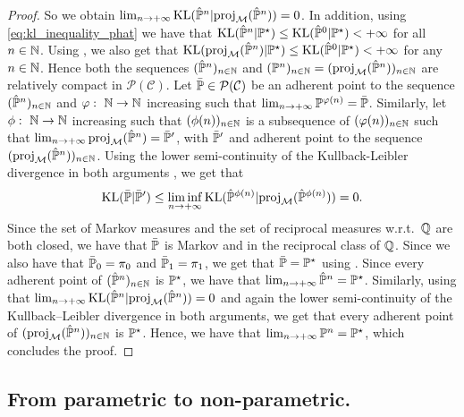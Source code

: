 \documentclass{article}
\begin{document}
\begin{proof}
So we obtain $\lim_{n \to +\infty} \mathrm{KL}( \hat{\mathbb{P}}^n | \mathrm{proj}_{\mathcal{M}}(\hat{\mathbb{P}}^n)) = 0$. In addition, using \eqref{eq:kl_inequality_phat} we have that $\mathrm{KL}(\hat{\mathbb{P}}^n | \mathbb{P}^\star) \leq \mathrm{KL}(\hat{\mathbb{P}}^0 | \mathbb{P}^\star) < +\infty$ for all $n \in \mathbb{N}$. Using \cite[Lemma 6]{shi2023DSBM}, we also get that $\mathrm{KL}(\mathrm{proj}_{\mathcal{M}}(\hat{\mathbb{P}}^n) | \mathbb{P}^\star) \leq \mathrm{KL}(\hat{\mathbb{P}}^0 | \mathbb{P}^\star) < +\infty$ for any $n \in \mathbb{N}$. Hence both the sequences $(\hat{\mathbb{P}}^n)_{n \in \mathbb{N}}$ and $(\mathbb{P}^n)_{n \in \mathbb{N}} = (\mathrm{proj}_{\mathcal{M}}(\hat{\mathbb{P}}^n))_{n \in \mathbb{N}}$ are relatively compact in $\mathcal{P}(\mathcal{C})$. 
Let $\bar{\mathbb{P}} \in \mathcal{P}(\mathcal{C})$ be an adherent point to the sequence $(\hat{\mathbb{P}}^n)_{n \in \mathbb{N}}$ and $\varphi: \ \mathbb{N} \to \mathbb{N}$ increasing such that $\lim_{n \to +\infty} \mathbb{P}^{\varphi(n)} = \bar{\mathbb{P}}$. Similarly, let $\phi: \ \nset \to \nset$ increasing such that $(\phi(n))_{n \in \mathbb{N}}$ is a subsequence of $(\varphi(n))_{n \in \mathbb{N}}$ such that $\lim_{n \to +\infty} \mathrm{proj}_{\mathcal{M}}(\hat{\mathbb{P}}^n) = \bar{\mathbb{P}}'$, with $\bar{\mathbb{P}}'$ and adherent point to the sequence $(\mathrm{proj}_{\mathcal{M}}(\hat{\mathbb{P}}^n))_{n \in \mathbb{N}}$. Using the lower semi-continuity of the Kullback-Leibler divergence in both arguments \citep{dupuis2011weak}, we get that 
\begin{equation}
 \mathrm{KL}(\bar{\mathbb{P}} | \bar{\mathbb{P}}') \leq \liminf_{n \to + \infty} \mathrm{KL}(\hat{\mathbb{P}}^{\phi(n)} | \mathrm{proj}_{\mathcal{M}}(\hat{\mathbb{P}}^{\phi(n)})) = 0 . 
\end{equation}
Since the set of Markov measures and the set of reciprocal measures w.r.t.~$\mathbb{Q}$ are both closed, we have that $\bar{\mathbb{P}}$ is Markov and in the reciprocal class of $\mathbb{Q}$. Since we also have that $\bar{\mathbb{P}}_0 = \pi_0$ and $\bar{\mathbb{P}}_1 = \pi_1$, we get that $\bar{\mathbb{P}} = \mathbb{P}^\star$ using . Since every adherent point of $(\hat{\mathbb{P}}^n)_{n \in \mathbb{N}}$ is $\mathbb{P}^\star$, we have that $\lim_{n \to +\infty} \hat{\mathbb{P}}^n = \mathbb{P}^\star$. Similarly, using that $\lim_{n \to +\infty} \mathrm{KL}( \hat{\mathbb{P}}^n | \mathrm{proj}_{\mathcal{M}}(\hat{\mathbb{P}}^n)) = 0$ and again the lower semi-continuity of the Kullback--Leibler divergence in both arguments, we get that every adherent point of $(\mathrm{proj}_{\mathcal{M}}(\hat{\mathbb{P}}^n))_{n \in \mathbb{N}}$ is $\mathbb{P}^\star$. Hence, we have that $\lim_{n \to +\infty} \mathbb{P}^n = \mathbb{P}^\star$, which concludes the proof. 
\end{proof}

\subsection{From parametric to non-parametric.} 
\label{sec:param_to_non_parametric}
\end{document}
